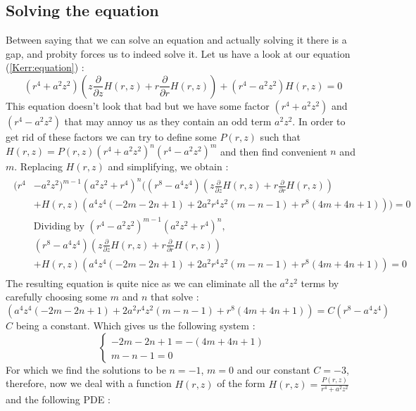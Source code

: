 \documentclass[a4paper,12pt]{article}
\theoremstyle{definition}
\begin{document}
\subsection{Solving the equation}
Between saying that we can solve an equation and actually solving it there is a gap, and probity forces us to indeed solve it.
Let us have a look at our equation (\ref{Kerr:equation}) :
\begin{equation}
	(r^4+a^2z^2)(z \frac{\partial}{\partial z}H(r,z)+r\frac{\partial}{\partial r}H(r,z))+(r^4-a^2 z^2) H(r,z)=0
\end{equation}
This equation doesn't look that bad but we have some factor $(r^4+a^2z^2)$ and $(r^4-a^2 z^2)$ that may annoy us as they contain an odd term $a^2z^2$.
In order to get rid of these factors we can try to define some $P(r,z)$ such that $H(r,z)=P(r,z)(r^4+a^2z^2)^n(r^4-a^2 z^2)^m$ and then find convenient $n$ and $m$.
Replacing $H(r,z)$ and simplifying, we obtain :
\begin{align}
\begin{split}
	(r^4&-a^2 z^2)^{m-1} (a^2z^2+r^4)^n((r^8-a^4 z^4)(z \frac{\partial}{\partial z}H(r,z)+r \frac{\partial}{\partial r}H(r,z))\\
   &+H(r,z)(a^4 z^4 (-2 m-2 n+1)+2 a^2 r^4 z^2 (m-n-1)+r^8(4 m+4 n+1)))=0\\
   &\text{Dividing by }(r^4-a^2 z^2)^{m-1} (a^2z^2+r^4)^n,\\
   &(r^8-a^4 z^4)(z \frac{\partial}{\partial z}H(r,z)+r \frac{\partial}{\partial r}H(r,z))\\
   &+H(r,z)(a^4 z^4 (-2 m-2 n+1)+2 a^2 r^4 z^2 (m-n-1)+r^8(4 m+4 n+1))=0
\end{split}
\end{align}
The resulting equation is quite nice as we can eliminate all the $a^2z^2$ terms by carefully choosing some $m$ and $n$ that solve :
\begin{equation}
	(a^4 z^4 (-2 m-2 n+1)+2 a^2 r^4 z^2 (m-n-1)+r^8(4 m+4 n+1))=C(r^8-a^4 z^4)
\end{equation}
$C$ being a constant. Which gives us the following system :
\begin{equation}
\begin{cases} -2 m-2 n+1=- (4 m+4 n+1)\\ m-n-1=0 \end{cases}
\end{equation}
For which we find the solutions to be $n=-1$, $m=0$ and our constant $C=-3$, therefore, now we deal with a function $H(r,z)$ of the form $H(r,z)=\frac{P(r,z)}{r^4+a^2z^2}$ and the following PDE :
\end{document}
